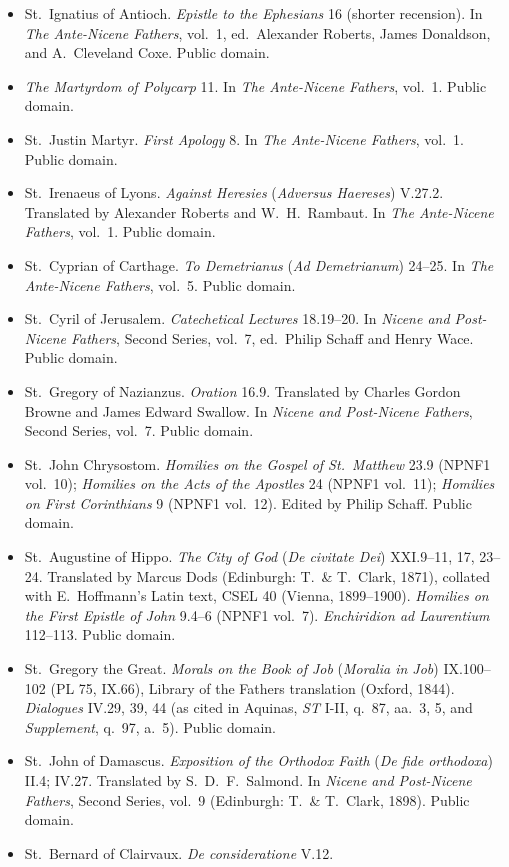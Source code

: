 \begin{itemize}
\item St.\ Ignatius of Antioch. \textit{Epistle to the Ephesians} 16 (shorter recension). In \textit{The Ante-Nicene Fathers}, vol.\ 1, ed.\ Alexander Roberts, James Donaldson, and A.\ Cleveland Coxe. Public domain.
\item \textit{The Martyrdom of Polycarp} 11. In \textit{The Ante-Nicene Fathers}, vol.\ 1. Public domain.
\item St.\ Justin Martyr. \textit{First Apology} 8. In \textit{The Ante-Nicene Fathers}, vol.\ 1. Public domain.
\item St.\ Irenaeus of Lyons. \textit{Against Heresies} (\textit{Adversus Haereses}) V.27.2. Translated by Alexander Roberts and W.\ H.\ Rambaut. In \textit{The Ante-Nicene Fathers}, vol.\ 1. Public domain.
\item St.\ Cyprian of Carthage. \textit{To Demetrianus} (\textit{Ad Demetrianum}) 24--25. In \textit{The Ante-Nicene Fathers}, vol.\ 5. Public domain.
\item St.\ Cyril of Jerusalem. \textit{Catechetical Lectures} 18.19--20. In \textit{Nicene and Post-Nicene Fathers}, Second Series, vol.\ 7, ed.\ Philip Schaff and Henry Wace. Public domain.
\item St.\ Gregory of Nazianzus. \textit{Oration} 16.9. Translated by Charles Gordon Browne and James Edward Swallow. In \textit{Nicene and Post-Nicene Fathers}, Second Series, vol.\ 7. Public domain.
\item St.\ John Chrysostom. \textit{Homilies on the Gospel of St.\ Matthew} 23.9 (NPNF1 vol.\ 10); \textit{Homilies on the Acts of the Apostles} 24 (NPNF1 vol.\ 11); \textit{Homilies on First Corinthians} 9 (NPNF1 vol.\ 12). Edited by Philip Schaff. Public domain.
\item St.\ Augustine of Hippo. \textit{The City of God} (\textit{De civitate Dei}) XXI.9--11, 17, 23--24. Translated by Marcus Dods (Edinburgh: T.\ \& T.\ Clark, 1871), collated with E.\ Hoffmann's Latin text, CSEL 40 (Vienna, 1899--1900). \textit{Homilies on the First Epistle of John} 9.4--6 (NPNF1 vol.\ 7). \textit{Enchiridion ad Laurentium} 112--113. Public domain.
\item St.\ Gregory the Great. \textit{Morals on the Book of Job} (\textit{Moralia in Job}) IX.100--102 (PL 75, IX.66), Library of the Fathers translation (Oxford, 1844). \textit{Dialogues} IV.29, 39, 44 (as cited in Aquinas, \textit{ST} I-II, q.\ 87, aa.\ 3, 5, and \textit{Supplement}, q.\ 97, a.\ 5). Public domain.
\item St.\ John of Damascus. \textit{Exposition of the Orthodox Faith} (\textit{De fide orthodoxa}) II.4; IV.27. Translated by S.\ D.\ F.\ Salmond. In \textit{Nicene and Post-Nicene Fathers}, Second Series, vol.\ 9 (Edinburgh: T.\ \& T.\ Clark, 1898). Public domain.
\item St.\ Bernard of Clairvaux. \textit{De consideratione} V.12.
\end{itemize}

